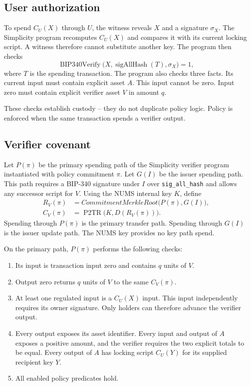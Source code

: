 \documentclass[11pt]{article}
\newcommand{\pTwoTR}{\operatorname{P2TR}}
\begin{document}
    \subsection{User authorization}

    To spend $C_U(X)$ through $U$, the witness reveals $X$ and a signature $\sigma_X$.
    The Simplicity program recomputes $C_U(X)$ and compares it with its current locking script.
    A witness therefore cannot substitute another key.
    The program then checks
    \begin{equation}
        \operatorname{BIP340Verify}\bigl(X,\operatorname{sigAllHash}(T),\sigma_X\bigr)=1,
    \end{equation}
    where $T$ is the spending transaction.
    The program also checks three facts.
    Its current input must contain explicit asset $A$.
    This input cannot be zero.
    Input zero must contain explicit verifier asset $V$ in amount $q$.

    These checks establish custody -- they do not duplicate policy logic.
    Policy is enforced when the same transaction spends a verifier output.

    \subsection{Verifier covenant}

    Let $P(\pi)$ be the primary spending path of the Simplicity verifier program instantiated with policy commitment $\pi$.
    Let $G(I)$ be the issuer spending path.
    This path requires a BIP-340 signature under $I$ over \texttt{sig\_all\_hash} and allows any successor script for $V$.
    Using the NUMS internal key $K$, define
    \begin{align}
        R_V(\pi) &= CommitmentMerkleRoot\bigl(P(\pi),G(I)\bigr), \\
        C_V(\pi) &= \pTwoTR\bigl(K,D(R_V(\pi))\bigr).
    \end{align}
    Spending through $P(\pi)$ is the primary transfer path.
    Spending through $G(I)$ is the issuer update path.
    The NUMS key provides no key path spend.

    On the primary path, $P(\pi)$ performs the following checks:

    \begin{enumerate}
        \item Its input is transaction input zero and contains $q$ units of $V$.
        \item Output zero returns $q$ units of $V$ to the same $C_V(\pi)$.
        \item At least one regulated input is a $C_U(X)$ input. This input independently requires its owner signature. Only holders can therefore advance the verifier output.
        \item Every output exposes its asset identifier. Every input and output of $A$ exposes a positive amount, and the verifier requires the two explicit totals to be equal. Every output of $A$ has locking script $C_U(Y)$ for its supplied recipient key $Y$.
        \item All enabled policy predicates hold.
    \end{enumerate}
\end{document}
